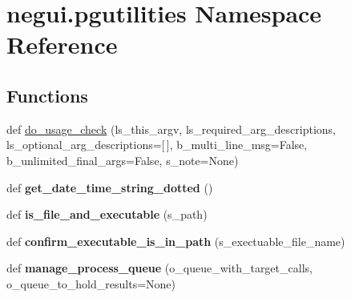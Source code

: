 \hypertarget{namespacenegui_1_1pgutilities}{}\section{negui.\+pgutilities Namespace Reference}
\label{namespacenegui_1_1pgutilities}
\subsection*{Functions}
\begin{DoxyCompactItemize}
\item 
def \hyperlink{namespacenegui_1_1pgutilities_a20a66168135d35b6713e38b2503f6289}{do\+\_\+usage\+\_\+check} (ls\+\_\+this\+\_\+argv, ls\+\_\+required\+\_\+arg\+\_\+descriptions, ls\+\_\+optional\+\_\+arg\+\_\+descriptions=\mbox{[}$\,$\mbox{]}, b\+\_\+multi\+\_\+line\+\_\+msg=False, b\+\_\+unlimited\+\_\+final\+\_\+args=False, s\+\_\+note=None)
\item 
def {\bfseries get\+\_\+date\+\_\+time\+\_\+string\+\_\+dotted} ()\hypertarget{namespacenegui_1_1pgutilities_a926d8ee0bffed0d961dcfc3d169e05a4}{}\label{namespacenegui_1_1pgutilities_a926d8ee0bffed0d961dcfc3d169e05a4}

\item 
def {\bfseries is\+\_\+file\+\_\+and\+\_\+executable} (s\+\_\+path)\hypertarget{namespacenegui_1_1pgutilities_a8a347fe70cfaae23658adb58cd312e93}{}\label{namespacenegui_1_1pgutilities_a8a347fe70cfaae23658adb58cd312e93}

\item 
def {\bfseries confirm\+\_\+executable\+\_\+is\+\_\+in\+\_\+path} (s\+\_\+exectuable\+\_\+file\+\_\+name)\hypertarget{namespacenegui_1_1pgutilities_a8fe3f14ed21663af6196c0c53349c536}{}\label{namespacenegui_1_1pgutilities_a8fe3f14ed21663af6196c0c53349c536}

\item 
def {\bfseries manage\+\_\+process\+\_\+queue} (o\+\_\+queue\+\_\+with\+\_\+target\+\_\+calls, o\+\_\+queue\+\_\+to\+\_\+hold\+\_\+results=None)\hypertarget{namespacenegui_1_1pgutilities_a2096f66a8484e74902fb97c787c79345}{}\label{namespacenegui_1_1pgutilities_a2096f66a8484e74902fb97c787c79345}


\end{DoxyCompactItemize}
